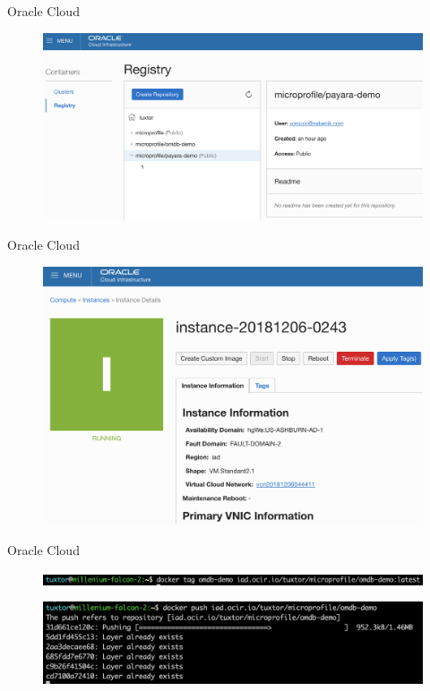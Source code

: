 \documentclass{beamer}
\begin{document}
\begin{frame}{Oracle Cloud}
\begin{figure}
\centering
\includegraphics[width=0.95\linewidth]{Images/oc1}
\end{figure}
\end{frame}

\begin{frame}{Oracle Cloud}
\begin{figure}
\centering
\includegraphics[width=0.95\linewidth]{Images/oc2}
\end{figure}
\end{frame}

\begin{frame}{Oracle Cloud}
\begin{figure}
\centering
\includegraphics[width=\linewidth]{Images/oc3}
\end{figure}

\begin{figure}
\centering
\includegraphics[width=\linewidth]{Images/oc4}
\end{figure}
\end{frame}
\end{document}
